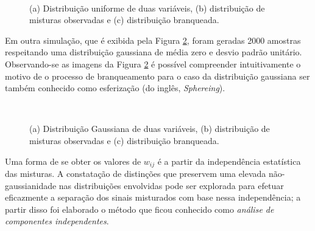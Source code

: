 \begin{figure}[H]
    \centering
    \\
    \caption{(a) Distribuição uniforme de duas variáveis, (b) distribuição de misturas observadas e (c) distribuição branqueada.}
    \label{fig:bss_whitening_data_uniform}
\end{figure}



Em outra simulação, que é exibida pela Figura \ref{fig:bss_whitening_data_gaussian}, foram geradas 2000 amostras respeitando uma distribuição gaussiana de média zero e desvio padrão unitário. Observando-se as imagens da Figura \ref{fig:bss_whitening_data_gaussian} é possível compreender intuitivamente o motivo de o processo de branqueamento para o caso da distribuição gaussiana ser também conhecido como esferização (do inglês, \textit{Sphereing}).


\begin{figure}[H]
    \centering
    \\
    \caption{(a) Distribuição Gaussiana de duas variáveis, (b) distribuição de misturas observadas e (c) distribuição branqueada.}
    \label{fig:bss_whitening_data_gaussian}
\end{figure}



Uma forma de se obter os valores de $w_{ij}$ é a partir da independência estatística das misturas. A constatação de distinções que preservem uma elevada não-gaussianidade nas distribuições envolvidas pode ser explorada para efetuar eficazmente a separação dos sinais misturados com base nessa independência; a partir disso foi elaborado o método que ficou conhecido como \textit{análise de componentes independentes}.





